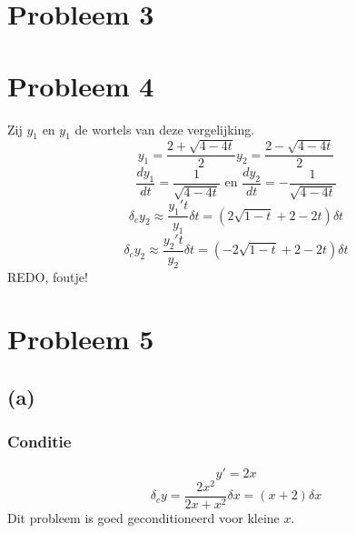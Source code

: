 \documentclass[12pt,a4paper]{article}
\begin{document}
\section{Probleem 3}


\section{Probleem 4}
Zij $y_1$ en $y_1$ de wortels van deze vergelijking.
\[
y_1 = \frac{2 + \sqrt{4 -4t}}{2}
y_2 = \frac{2 - \sqrt{4 -4t}}{2}
\]
\[
\frac{dy_1}{dt} = \frac{1}{\sqrt{4-4t}}
\text{ en }
\frac{dy_2}{dt} = -\frac{1}{\sqrt{4-4t}}
\]
\[
\delta_cy_2 \approx
\frac{y_1't}{y_1}\delta t
= (2\sqrt{1-t} + 2 -2t) \delta t
\]
\[
\delta_cy_2 \approx
\frac{y_2't}{y_2}\delta t
= (-2\sqrt{1-t} + 2 -2t) \delta t
\]
REDO, foutje!

\section{Probleem 5}
\subsection{(a)}
\subsubsection{Conditie}
\[
y' = 2x
\]
\[
\delta_cy = \frac{2x^2}{2x+x^2}\delta x = (x + 2)\delta x
\]
Dit probleem is goed geconditioneerd voor kleine $x$.
\end{document}
